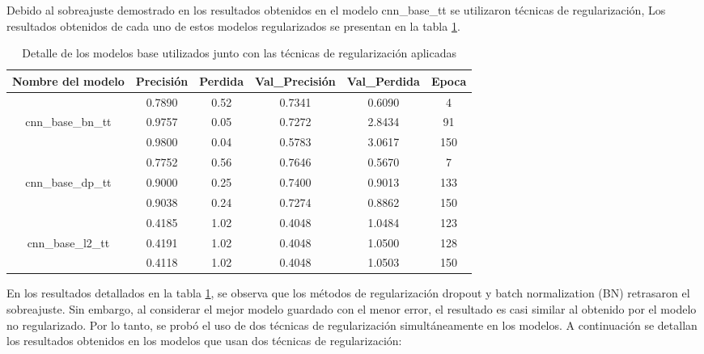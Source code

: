 Debido al sobreajuste demostrado en los resultados obtenidos en el modelo cnn\_base\_tt se utilizaron técnicas de regularización, Los resultados obtenidos de cada uno de estos modelos regularizados se presentan en la tabla \ref{tbl:7}.

\begin{table}[!ht]
	\centering
	\begin{tabular}{|c|c|c|c|c|c|}
		\hline
		\textbf{Nombre del modelo} & \textbf{Precisión} & \textbf{Perdida} & \textbf{Val\_Precisión} & \textbf{Val\_Perdida} & \textbf{Epoca} \\ \hline
		~ & 0.7890 & 0.52 & 0.7341 & 0.6090 & 4 \\ \cline{2-6} 
		cnn\_base\_bn\_tt & 0.9757 & 0.05 & 0.7272 & 2.8434 & 91 \\ \cline{2-6} 
		~ & 0.9800 & 0.04 & 0.5783 & 3.0617 & 150 \\ \hline
		~ & 0.7752 & 0.56 & 0.7646 & 0.5670 & 7 \\ \cline{2-6} 
		cnn\_base\_dp\_tt & 0.9000 & 0.25 & 0.7400 & 0.9013 & 133 \\ \cline{2-6} 
		~ & 0.9038 & 0.24 & 0.7274 & 0.8862 & 150 \\ \hline
		~ & 0.4185 & 1.02 & 0.4048 & 1.0484 & 123 \\ \cline{2-6} 
		cnn\_base\_l2\_tt & 0.4191 & 1.02 & 0.4048 & 1.0500 & 128 \\ \cline{2-6} 
		~ & 0.4118 & 1.02 & 0.4048 & 1.0503 & 150 \\ \hline
	\end{tabular}
	\caption{Detalle de los modelos base utilizados junto con las técnicas de regularización aplicadas}
	\label{tbl:7}
\end{table}

En los resultados detallados en la tabla \ref{tbl:7}, se observa que los métodos de regularización dropout y batch normalization (BN) retrasaron el sobreajuste. Sin embargo, al considerar el mejor modelo guardado con el menor error, el resultado es casi similar al obtenido por el modelo no regularizado. Por lo tanto, se probó el uso de dos técnicas de regularización simultáneamente en los modelos. A continuación se detallan los resultados obtenidos en los modelos que usan dos técnicas de regularización:

